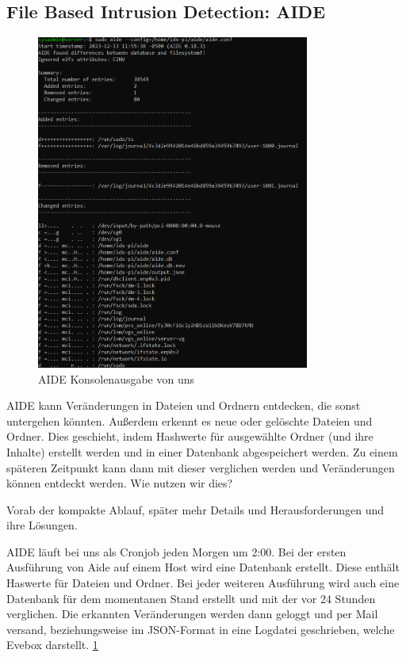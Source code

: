 \documentclass{article}
\begin{document}
\subsection{File Based Intrusion Detection: AIDE}
\begin{figure}
    \centering
    \includegraphics[width=0.8\textwidth]{assets/AIDE.png}
    \caption[AIDE Konsolenausgabe]{\label{fig:AIDE}AIDE Konsolenausgabe von uns}
\end{figure}

AIDE kann Veränderungen in Dateien und Ordnern entdecken, die sonst untergehen könnten. Außerdem erkennt es neue oder gelöschte Dateien und Ordner. Dies geschieht, indem Hashwerte für ausgewählte Ordner (und ihre Inhalte) erstellt werden und in einer Datenbank abgespeichert werden. Zu einem späteren Zeitpunkt kann dann mit dieser verglichen werden und Veränderungen können entdeckt werden. Wie nutzen wir dies?

Vorab der kompakte Ablauf, später mehr Details und Herausforderungen und ihre Lösungen.

AIDE läuft bei uns als Cronjob jeden Morgen um 2:00.
Bei der ersten Ausführung von Aide auf einem Host wird eine Datenbank erstellt. Diese enthält Haswerte für Dateien und Ordner. Bei jeder weiteren Ausführung wird auch eine Datenbank für dem momentanen Stand erstellt und mit der vor 24 Stunden verglichen.
Die erkannten Veränderungen werden dann geloggt und per Mail versand, beziehungsweise im JSON-Format in eine Logdatei geschrieben, welche Evebox darstellt. \ref{fig:AIDE}
\end{document}
